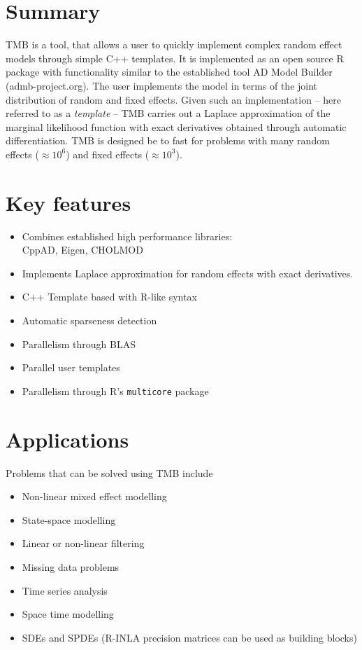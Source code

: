 \documentclass[largefonts]{sciposter}
\begin{document}
\begin{multicols}{3}



\section*{Summary}
TMB is a tool, that allows a user to quickly implement complex random
effect models through simple C++ templates. It is implemented as an
open source R package with functionality similar to the established tool AD Model Builder
(admb-project.org). The user implements the model in terms of the
joint distribution of random and fixed effects. Given such an
implementation -- here referred to as a \emph{template} -- TMB carries
out a Laplace approximation of the marginal likelihood function with
exact derivatives obtained through automatic differentiation. TMB is
designed be to fast for problems with many random effects
($\approx 10^6$) and fixed effects ($\approx 10^3$).

\section{Key features}
\begin{itemize}
  \item Combines established high performance libraries: \\ CppAD, Eigen, CHOLMOD
  \item Implements Laplace approximation for random effects with exact derivatives.
  \item C++ Template based with R-like syntax
  \item Automatic sparseness detection
  \item Parallelism through BLAS
  \item Parallel user templates
  \item Parallelism through R's \texttt{multicore} package 
\end{itemize}

\section{Applications}
Problems that can be solved using TMB include
\begin{itemize}
\item Non-linear mixed effect modelling
\item State-space modelling
\item Linear or non-linear filtering
\item Missing data problems
\item Time series analysis
\item Space time modelling
\item SDEs and SPDEs (R-INLA precision matrices can be used as building blocks)
\end{itemize}



\end{multicols}
\end{document}
